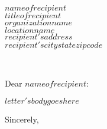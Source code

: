 \documentclass{letter}
\makeatletter
\def\opening#1{\ifx\@empty\fromaddress
	\thispagestyle{firstpage}%
	{\raggedleft\@date\par}%
	\else  %
	\thispagestyle{empty}%
	{\noindent\let\\\cr\halign{##\hfil\cr\ignorespaces
			\fromaddress \cr\noalign{\kern 8\parskip}%
			\@date\cr}\par}%
	\fi
	\vspace{4\parskip}%
	{\raggedright \toname \\ \toaddress \par}%
	\vspace{1\parskip}
	#1\par\nobreak}
\makeatother
\begin{document}
\begin{letter}{
		$name of recipient$\\
		$title of recipient$\\
		$organization name$\\
		$location name$\\
		$recipient's address$\\
		$recipient's city state zipcode$\\}

\opening{Dear $name of recipient$:}

$letter's body goes here$

\closing{Sincerely,}


\end{letter}
\end{document}
